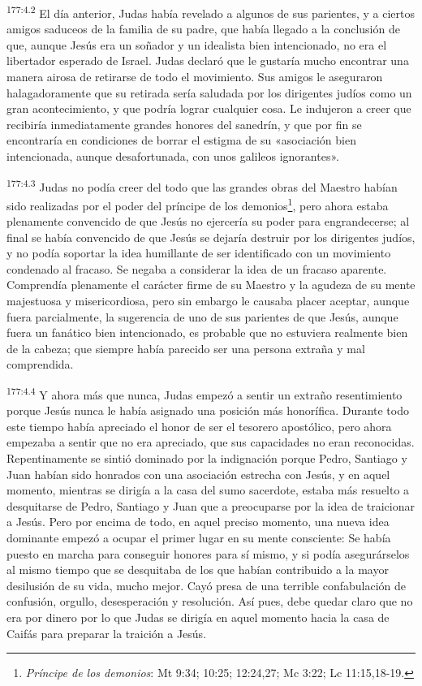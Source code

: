 \par
\textsuperscript{177:4.2} El día anterior, Judas había revelado a algunos de sus parientes, y a ciertos amigos saduceos de la familia de su padre, que había llegado a la conclusión de que, aunque Jesús era un soñador y un idealista bien intencionado, no era el libertador esperado de Israel. Judas declaró que le gustaría mucho encontrar una manera airosa de retirarse de todo el movimiento. Sus amigos le aseguraron halagadoramente que su retirada sería saludada por los dirigentes judíos como un gran acontecimiento, y que podría lograr cualquier cosa. Le indujeron a creer que recibiría inmediatamente grandes honores del sanedrín, y que por fin se encontraría en condiciones de borrar el estigma de su «asociación bien intencionada, aunque desafortunada, con unos galileos ignorantes».

\par
\textsuperscript{177:4.3} Judas no podía creer del todo que las grandes obras del Maestro habían sido realizadas por el poder del príncipe de los demonios\footnote{\textit{Príncipe de los demonios}: Mt 9:34; 10:25; 12:24,27; Mc 3:22; Lc 11:15,18-19.}, pero ahora estaba plenamente convencido de que Jesús no ejercería su poder para engrandecerse; al final se había convencido de que Jesús se dejaría destruir por los dirigentes judíos, y no podía soportar la idea humillante de ser identificado con un movimiento condenado al fracaso. Se negaba a considerar la idea de un fracaso aparente. Comprendía plenamente el carácter firme de su Maestro y la agudeza de su mente majestuosa y misericordiosa, pero sin embargo le causaba placer aceptar, aunque fuera parcialmente, la sugerencia de uno de sus parientes de que Jesús, aunque fuera un fanático bien intencionado, es probable que no estuviera realmente bien de la cabeza; que siempre había parecido ser una persona extraña y mal comprendida.

\par
\textsuperscript{177:4.4} Y ahora más que nunca, Judas empezó a sentir un extraño resentimiento porque Jesús nunca le había asignado una posición más honorífica. Durante todo este tiempo había apreciado el honor de ser el tesorero apostólico, pero ahora empezaba a sentir que no era apreciado, que sus capacidades no eran reconocidas. Repentinamente se sintió dominado por la indignación porque Pedro, Santiago y Juan habían sido honrados con una asociación estrecha con Jesús, y en aquel momento, mientras se dirigía a la casa del sumo sacerdote, estaba más resuelto a desquitarse de Pedro, Santiago y Juan que a preocuparse por la idea de traicionar a Jesús. Pero por encima de todo, en aquel preciso momento, una nueva idea dominante empezó a ocupar el primer lugar en su mente consciente: Se había puesto en marcha para conseguir honores para sí mismo, y si podía asegurárselos al mismo tiempo que se desquitaba de los que habían contribuido a la mayor desilusión de su vida, mucho mejor. Cayó presa de una terrible confabulación de confusión, orgullo, desesperación y resolución. Así pues, debe quedar claro que no era por dinero por lo que Judas se dirigía en aquel momento hacia la casa de Caifás para preparar la traición a Jesús.

